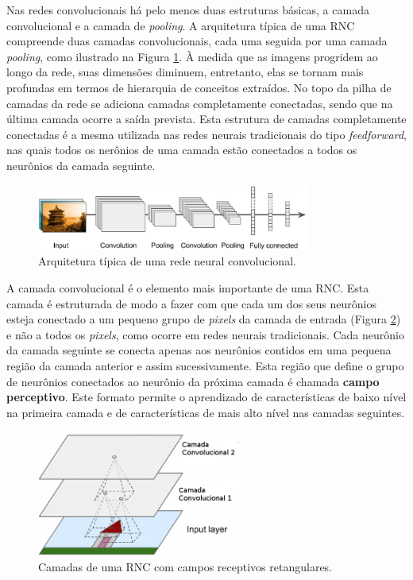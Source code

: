 Nas redes convolucionais há pelo menos duas estruturas básicas, a camada convolucional e a camada de \textit{pooling}.
A arquitetura típica de uma RNC compreende duas camadas convolucionais, cada uma seguida por
uma camada \textit{pooling}, como ilustrado na Figura \ref{fig:cnn_basic_arq}. À medida que as imagens progridem
ao longo da rede, suas dimensões diminuem, entretanto, elas se tornam mais profundas
em termos de hierarquia de conceitos extraídos. No topo da pilha de camadas da rede
se adiciona camadas completamente conectadas, sendo que na última camada ocorre a saída prevista.
Esta estrutura de camadas completamente conectadas é a mesma utilizada nas redes neurais tradicionais
do tipo \textit{feedforward}, nas quais todos os nerônios de uma camada estão conectados a todos os
neurônios da camada seguinte. 
\begin{figure}[htp]
\begin{center}
  \includegraphics[width=0.8\textwidth]{fig/cnn_basic_arq}
  \caption{Arquitetura típica de uma rede neural convolucional. \citep{aurelien17}}
  \label{fig:cnn_basic_arq}
\end{center}
\end{figure}

A camada convolucional é o elemento mais importante de uma RNC. Esta camada é estruturada
de modo a fazer com que cada um dos seus neurônios esteja conectado a um 
pequeno grupo de \textit{pixels} da camada de entrada (Figura \ref{fig:cnn_arq}) e não a todos os \textit{pixels}, como
ocorre em redes neurais tradicionais. Cada neurônio da camada seguinte se conecta apenas aos neurônios
contidos em uma pequena região da camada anterior e assim sucessivamente. Esta região que define
o grupo de neurônios conectados ao neurônio da próxima camada é chamada \textbf{campo perceptivo}.
Este formato permite o aprendizado de características de baixo nível na primeira camada e de
características de mais alto nível nas camadas seguintes.
\begin{figure}[htp]
\begin{center}
  \includegraphics[width=0.6\textwidth]{fig/cnn_arq}
  \caption{Camadas de uma RNC com campos receptivos retangulares.}
  \label{fig:cnn_arq}
\end{center}
\end{figure}

